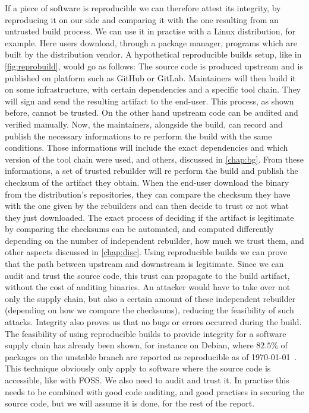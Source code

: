 \documentclass[a4paper,11pt,oneside]{report}
\theoremstyle{definition}
\newcommand{\rb}{reproducible builds\xspace}
\begin{document}
If a piece of software is reproducible we can therefore attest its integrity,
by reproducing it on our side and comparing it with the one resulting from an
untrusted build process. We can use it in practise with a Linux distribution,
for example. Here users download, through a package manager, programs which are
built by the distribution vendor. A hypothetical \rb setup, like in
\autoref{fig:reprobuild}, would go as follows: The source code is produced
upstream and is published on platform such as GitHub or GitLab. Maintainers
will then build it on some infrastructure, with certain dependencies and a
specific tool chain. They will sign and send the resulting artifact to the
end-user. This process, as shown before, cannot be trusted. On the other hand
upstream code can be audited and verified manually. Now, the maintainers,
alongside the build, can record and publish the necessary informations to re
perform the build with the same conditions. Those informations will include the
exact dependencies and which version of the tool chain were used, and others,
discussed in \autoref{chap:bg}. From these informations, a set of trusted
rebuilder will re perform the build and publish the checksum of the artifact
they obtain. When the end-user download the binary from the distribution's
repositories, they can compare the checksum they have with the one given by the
rebuilders and can then decide to trust or not what they just downloaded. The
exact process of deciding if the artifact is legitimate by comparing the
checksums can be automated, and computed differently depending on the number of
independent rebuilder, how much we trust them, and other aspects discussed in
\autoref{chap:disc}. 
Using \rb we can prove that the path between upstream and downstream is
legitimate. Since we can audit and trust the source code, this trust can
propagate to the build artifact, without the cost of auditing binaries. An
attacker would have to take over not only the supply chain, but also a certain
amount of these independent rebuilder (depending on how we compare the
checksums), reducing the feasibility of such attacks. Integrity also proves us
that no bugs or errors occurred during the build. The feasibility of using \rb
to provide integrity for a software supply chain has already been shown, for
instance on Debian, where $82.5\%$ of packages on the unstable branch are
reported as reproducible as of \today~\cite{debian:repro}.
This technique obviously only apply to software where the source code is
accessible, like with FOSS. We also need to audit and trust it. In practise
this needs to be combined with good code auditing, and good practises in
securing the source code, but we will assume it is done, for the rest of the
report.
\end{document}
